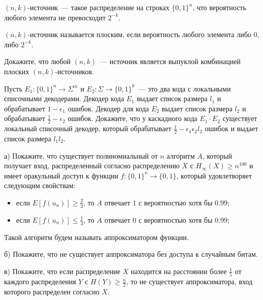 \setcounter{curtask}{25}


$(n, k)$-источник~--- такое распределение на строках $\{0, 1\}^n$, что вероятность любого элемента не превосходит $2^{-k}$.

$(n, k)$-источник называется плоским, если вероятность любого элемента либо $0$, либо $2^{-k}$.


\begin{task}
    Докажите, что любой $(n, k)$~--- источник является выпуклой комбинацией плоских $(n, k)$-источников.
\end{task}

\begin{task}
    Пусть $E_1: \{0, 1\}^n \rightarrow \Sigma^m$ и $E_2: \Sigma \rightarrow \{0, 1\}^k$~--- это два кода с локальными списочными
    декодерами. Декодер кода $E_1$ выдает список размера $l_1$ и обрабатывает $1 - \epsilon_1$ ошибок. Декодер для кода $E_2$
    выдает список размера $l_2$ и обрабатывает $\frac{1}{2} - \epsilon_2$ ошибок. Докажите, что у каскадного кода $E_1 \cdot E_2$
    существует локальный списочный декодер, который обрабатывает $\frac{1}{2} - \epsilon_1 \epsilon_2 l_2$ ошибок и выдает список
    размера $l_1 l_2$.
\end{task}

\begin{task}
    а) Покажите, что существует полиномиальный от $n$ алгоритм $A$, который получает вход, распределенный согласно распределению
    $X$ с $H_{\infty}(X) \ge n^{100}$ и имеет оракульный доступ к функции $f: \{0, 1\}^n \rightarrow \{0, 1\}$, который
    удовлетворяет следующим свойствам:
    \begin{itemize}
        \item если $E[f(u_n)] \ge \frac{2}{3}$, то $A$ отвечает $1$ с вероятностью хотя бы $0.99$;
        \item если $E[f(u_n)] \le \frac{1}{3}$, то $A$ отвечает $0$ с вероятностью хотя бы $0.99$;
	\end{itemize}

    Такой алгоритм будем называть аппроксиматором функции.

    б) Покажите, что не существует аппроксиматора без доступа к случайным битам.

    в) Покажите, что если распределение $X$ находится на расстоянии более $\frac{1}{5}$ от каждого распределения $Y$ с $H(Y) \ge
    \frac{n}{2}$, то не существует аппроксиматора, вход которого распределен согласно $X$.
\end{task}




